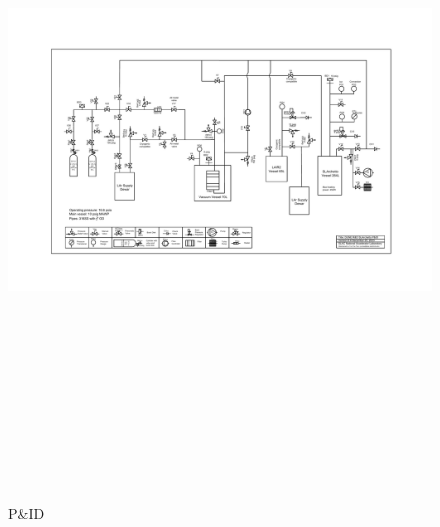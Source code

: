 \documentclass[letterpaper,11pt]{article}
\begin{document}
\clearpage
\begin{figure}[htb]
\begin{center}
\includegraphics[angle=90,origin=c,height=7.3in]{fig/PIDv8.4.pdf}
\caption{P\&ID}
\label{fig:PID}
\end{center}
\end{figure}
\clearpage
\end{document}
